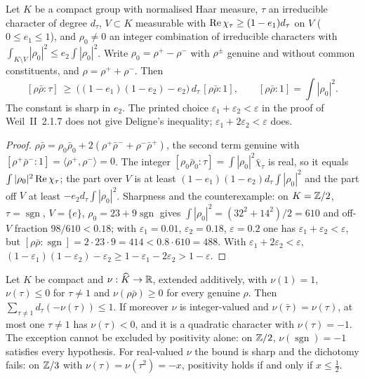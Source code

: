 \begin{lemma}\label{lem:concentration}
Let $K$ be a compact group with normalised Haar measure, $\tau$ an irreducible character of degree $d_\tau$, $V\subset K$ measurable with $\operatorname{Re}\chi_\tau\ge(1-e_1)d_\tau$ on $V$ ($0\le e_1\le1$), and $\rho_0\ne0$ an integer combination of irreducible characters with $\int_{K\setminus V}|\rho_0|^2\le e_2\int|\rho_0|^2$. Write $\rho_0=\rho^+-\rho^-$ with $\rho^\pm$ genuine and without common constituents, and $\rho=\rho^++\rho^-$. Then
\[
[\rho\bar\rho:\tau]\ \ge\ \big((1-e_1)(1-e_2)-e_2\big)\,d_\tau\,[\rho\bar\rho:1],\qquad[\rho\bar\rho:1]=\int|\rho_0|^2 .
\]
The constant is sharp in $e_2$. The printed choice $\varepsilon_1+\varepsilon_2<\varepsilon$ in the proof of Weil~II~2.1.7 does not give Deligne's inequality; $\varepsilon_1+2\varepsilon_2<\varepsilon$ does.
\end{lemma}

\begin{proof}
$\rho\bar\rho=\rho_0\bar\rho_0+2(\rho^+\bar\rho^-+\rho^-\bar\rho^+)$, the second term genuine with $[\rho^+\bar\rho^-:1]=\langle\rho^+,\rho^-\rangle=0$. The integer $[\rho_0\bar\rho_0:\tau]=\int|\rho_0|^2\bar\chi_\tau$ is real, so it equals $\int|\rho_0|^2\operatorname{Re}\chi_\tau$; the part over $V$ is at least $(1-e_1)(1-e_2)d_\tau\int|\rho_0|^2$ and the part off $V$ at least $-e_2d_\tau\int|\rho_0|^2$.
Sharpness and the counterexample: on $K=\mathbb{Z}/2$, $\tau=\operatorname{sgn}$, $V=\{e\}$, $\rho_0=23+9\operatorname{sgn}$ gives $\int|\rho_0|^2=(32^2+14^2)/2=610$ and off-$V$ fraction $98/610<0.18$; with $\varepsilon_1=0.01$, $\varepsilon_2=0.18$, $\varepsilon=0.2$ one has $\varepsilon_1+\varepsilon_2<\varepsilon$, but $[\rho\bar\rho:\operatorname{sgn}]=2\cdot23\cdot9=414<0.8\cdot610=488$. With $\varepsilon_1+2\varepsilon_2<\varepsilon$, $(1-\varepsilon_1)(1-\varepsilon_2)-\varepsilon_2\ge1-\varepsilon_1-2\varepsilon_2>1-\varepsilon$.
\end{proof}

\begin{lemma}\label{lem:intpos}
Let $K$ be compact and $\nu:\widehat K\to\mathbb{R}$, extended additively, with $\nu(1)=1$, $\nu(\tau)\le0$ for $\tau\ne1$ and $\nu(\rho\bar\rho)\ge0$ for every genuine $\rho$. Then $\sum_{\tau\ne1}d_\tau(-\nu(\tau))\le1$. If moreover $\nu$ is integer-valued and $\nu(\bar\tau)=\nu(\tau)$, at most one $\tau\ne1$ has $\nu(\tau)<0$, and it is a quadratic character with $\nu(\tau)=-1$. The exception cannot be excluded by positivity alone: on $\mathbb{Z}/2$, $\nu(\operatorname{sgn})=-1$ satisfies every hypothesis. For real-valued $\nu$ the bound is sharp and the dichotomy fails: on $\mathbb{Z}/3$ with $\nu(\tau)=\nu(\tau^2)=-x$, positivity holds if and only if $x\le\tfrac12$.
\end{lemma}

